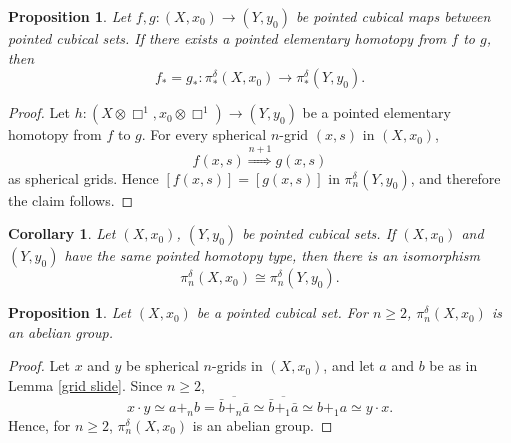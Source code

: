 \documentclass[oneside, 12pt]{amsart}
\numberwithin{equation}{section}
\theoremstyle{plain}
\newtheorem{proposition}[theorem]{Proposition}
\newtheorem{corollary}[theorem]{Corollary}
\theoremstyle{definition}
\theoremstyle{remark}
\begin{document}
	
	
	\begin{proposition}
		\label{homotopy invariance}
		Let $f,g\colon(X,x_0)\to(Y,y_0)$ be pointed cubical maps between pointed cubical sets. If there exists a pointed elementary homotopy from $f$ to $g$, then
		\[
		f_*=g_*\colon\pi_*^\delta(X,x_0)\to\pi_*^\delta(Y,y_0).
		\]
	\end{proposition}
	
	\begin{proof}
		Let $h\colon(X\otimes\Box^1,x_0\otimes\Box^1)\to(Y,y_0)$ be a pointed elementary homotopy from $f$ to $g$. For every spherical $n$-grid $(x,s)$ in $(X,x_0)$,
		\[
		f(x,s)\overset{n+1}{\Rightarrow}g(x,s)
		\]
		as spherical grids. Hence $[f(x,s)]=[g(x,s)]$ in $\pi_n^\delta(Y,y_0)$, and therefore the claim follows.
	\end{proof}
	
	\begin{corollary}
			\label{dhg under he}
			Let $(X,x_0)$, $(Y,y_0)$ be pointed cubical sets. If $(X,x_0)$ and $(Y,y_0)$ have the same pointed homotopy type, then there is an isomorphism
			\[
			\pi_n^\delta(X,x_0)\cong\pi_n^\delta(Y,y_0).
			\]
	\end{corollary}
	
	\begin{proposition}
		Let $(X,x_0)$ be a pointed cubical set. For $n\ge 2$, $\pi_n^\delta(X,x_0)$ is an abelian group.
	\end{proposition}
	
	\begin{proof}
		Let $x$ and $y$ be spherical $n$-grids in $(X,x_0)$, and let $a$ and $b$ be as in Lemma \ref{grid slide}. Since $n\ge 2$,
		\[
		x\cdot y\simeq a+_nb=\overline{\bar{b}+_n\bar{a}}\simeq \overline{\bar{b}+_1\bar{a}}\simeq b+_1a\simeq y\cdot x.
		\]
		Hence, for $n\ge 2$, $\pi_n^\delta(X,x_0)$ is an abelian group.
	\end{proof}
	
\end{document}
